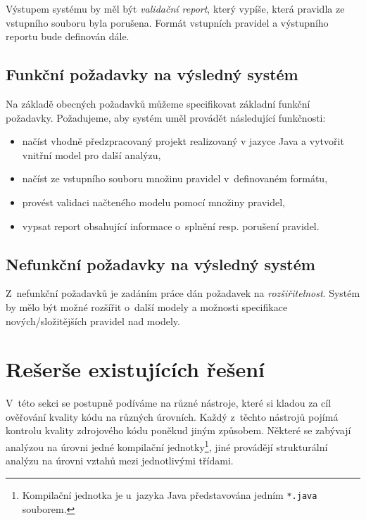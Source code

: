 Výstupem systému by měl být \emph{validační report}, který vypíše, která pravidla ze vstupního souboru byla porušena. Formát vstupních pravidel a výstupního reportu bude definován dále.

\subsection{Funkční požadavky na výsledný systém}

Na základě obecných požadavků můžeme specifikovat základní funkční požadavky. Požadujeme, aby systém uměl provádět následující funkčnosti:
\begin{itemize}
\item načíst vhodně předzpracovaný projekt realizovaný v jazyce Java a vytvořit vnitřní model pro další analýzu,
\item načíst ze vstupního souboru množinu pravidel v~definovaném formátu,
\item provést validaci načteného modelu pomocí množiny pravidel,
\item vypsat report obsahující informace o~splnění resp. porušení pravidel.
\end{itemize}

\subsection{Nefunkční požadavky na výsledný systém}
Z~nefunkční požadavků je zadáním práce dán požadavek na \emph{rozšiřitelnost}. Systém by mělo být možné rozšířit o~další modely a možnosti specifikace nových/složitějších pravidel nad modely.

\section{Rešerše existujících řešení}
\label{requirements-existing_tools}

V~této sekci se postupně podíváme na různé nástroje, které si kladou za cíl ověřování kvality kódu na různých úrovních. Každý z~těchto nástrojů pojímá kontrolu kvality zdrojového kódu poněkud jiným způsobem. Některé se zabývají  analýzou na úrovni jedné kompilační jednotky\footnote{Kompilační jednotka je u~jazyka Java představována jedním \verb-*.java- souborem.}, jiné provádějí strukturální analýzu na úrovni vztahů mezi jednotlivými třídami.

